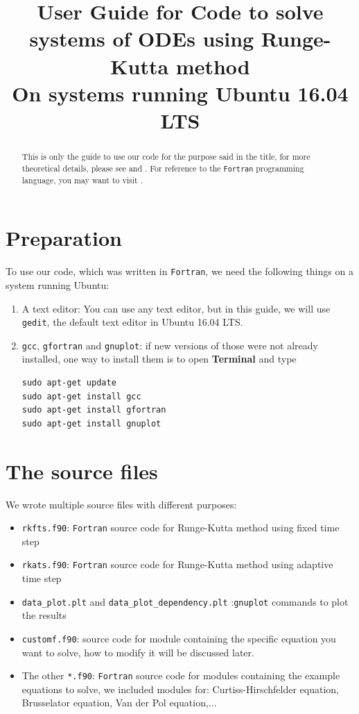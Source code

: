 \documentclass{article}
\begin{document}
	\title{User Guide for Code to solve systems of ODEs using Runge-Kutta method\\On systems running Ubuntu 16.04 LTS}
	\maketitle
	\begin{abstract}
		This is only the guide to use our code for the purpose said in the title, for more theoretical details, please see \cite{1} and \cite{2}. For reference to the \texttt{Fortran} programming language, you may want to visit \cite{3}.
	\end{abstract}
	\tableofcontents
	\newpage
	\noindent
	\section{Preparation}
	To use our code, which was written in \texttt{Fortran}, we need the following things on a system running Ubuntu:
	\begin{enumerate}
		\item A text editor: You can use any text editor, but in this guide, we will use \texttt{gedit}, the default text editor in Ubuntu 16.04 LTS.
		\item \texttt{gcc}, \texttt{gfortran} and \texttt{gnuplot}: if new versions of those were not already installed, one way to install them is to open \textbf{Terminal} and type
		\begin{lstlisting}
sudo apt-get update
sudo apt-get install gcc
sudo apt-get install gfortran
sudo apt-get install gnuplot
		\end{lstlisting}
	\end{enumerate}
	\section{The source files}
	We wrote multiple source files with different purposes:
	\begin{itemize}
		\item \texttt{rkfts.f90}: \texttt{Fortran} source code for Runge-Kutta method using fixed time step
		\item \texttt{rkats.f90}: \texttt{Fortran} source code for Runge-Kutta method using adaptive time step
		\item \texttt{data\_plot.plt} and \texttt{data\_plot\_dependency.plt} :\texttt{gnuplot} commands to plot the results
		\item \texttt{customf.f90}: source code for module containing the specific equation you want to solve, how to modify it will be discussed later.
		\item The other \texttt{*.f90}: \texttt{Fortran} source code for modules containing the example equations to solve, we included modules for: Curtiss-Hirschfelder equation, Brusselator equation, Van der Pol equation,$\dots$
	\end{itemize}
\end{document}
